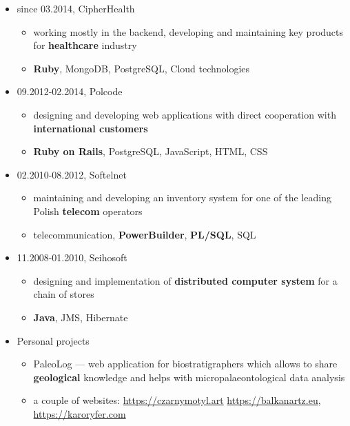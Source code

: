 \documentclass[a4paper]{article}
\begin{document}
\begin{itemize}
  \item
  since 03.2014,
  CipherHealth
  \begin{itemize}
    \item
      working mostly in the backend, developing and maintaining key products for \textbf{healthcare} industry
    \item
      \textbf{Ruby}, MongoDB, PostgreSQL, Cloud technologies
  \end{itemize}
  \item
    09.2012-02.2014,
    Polcode
    \begin{itemize}
      \item
        designing and developing web applications with direct cooperation with \textbf{international customers}
      \item
        \textbf{Ruby on Rails}, PostgreSQL, JavaScript, HTML, CSS
    \end{itemize}
  \item
    02.2010-08.2012,
    Softelnet
    \begin{itemize}
      \item
        maintaining and developing an inventory system
        for one of the leading Polish \textbf{telecom} operators
      \item
        telecommunication, \textbf{PowerBuilder}, \textbf{PL/SQL}, SQL
    \end{itemize}
  \item
    11.2008-01.2010,
    Seihosoft
    \begin{itemize}
      \item
        designing and implementation of \textbf{distributed computer system}
        for a chain of stores
      \item
        \textbf{Java}, JMS, Hibernate
    \end{itemize}
  \item
    Personal projects
    \begin{itemize}
      \item
        PaleoLog --- web application for biostratigraphers which allows
        to share \textbf{geological} knowledge
        and helps with micropalaeontological data analysis
      \item
        a couple of websites: \href{https://czarnymotyl.art}{https://czarnymotyl.art} \href{https://balkanartz.eu}{https://balkanartz.eu}, \href{https://karoryfer.com}{https://karoryfer.com}
    \end{itemize}
\end{itemize}
\end{document}
